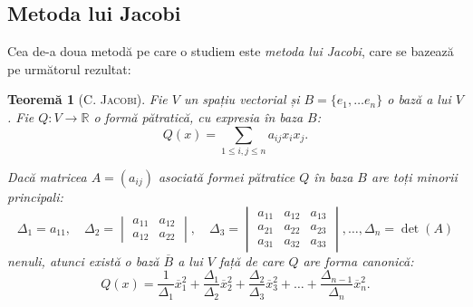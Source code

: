 \documentclass[11pt,a4paper]{article}
\theoremstyle{dotless}
\newtheorem{theorem}{Teorem\u{a}}[section]
\theoremstyle{dotlessdr}
\begin{document}

\subsection{Metoda lui Jacobi}

\indent\indent Cea de-a doua metodă pe care o studiem este \emph{metoda lui
Jacobi}, care se bazează pe următorul rezultat:
\begin{theorem}[\textsc{C. Jacobi}]
	Fie $V$ un spațiu vectorial și $B = \{e_1, \dots e_n\}$ o bază a lui $V$.
Fie $Q : V \to \mathbb{R}$ o formă pătratică, cu expresia în baza $B$: 
 \[
	Q(x) = \sum_{1 \leq i, j \leq n} a_{ij} x_i x_j.
\]

Dacă matricea $A = (a_{ij})$ asociată formei pătratice $Q$ în baza $B$ are toți
minorii principali: 
 \[
	\Delta_1 = a_{11}, \quad \Delta_2 = \begin{vmatrix}
	                                        a_{11} & a_{12} \\
	                                        a_{12} & a_{22}
                                        \end{vmatrix}, \quad
    \Delta_3 = \begin{vmatrix}
	               a_{11} & a_{12} & a_{13} \\
	               a_{21} & a_{22} & a_{23} \\
	               a_{31} & a_{32} & a_{33}
               \end{vmatrix}, \dots, \Delta_n = \det(A)
\]
nenuli, atunci există o bază $\overline{B}$ a lui $V$ față de care $Q$ are
forma canonică: 
 \[
	Q(x) = \dfrac{1}{\Delta_1} \overline{x}_1^2 + \dfrac{\Delta_1}{\Delta_2}
	        \overline{x}_2^2 + \dfrac{\Delta_2}{\Delta_3} \overline{x}_3^2 +
	        \dots + \dfrac{\Delta_{n-1}}{\Delta_n} \overline{x}_n^2.
\]
\end{theorem}
\end{document}

